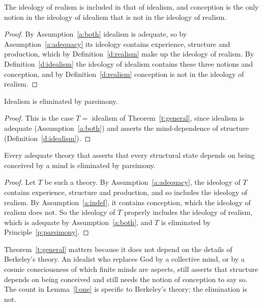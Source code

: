 \documentclass{situationist-preprint}
\begin{document}
\begin{lemma}\label{l:one}
The ideology of realism is included in that of idealism, and conception is the only notion in the ideology of idealism that is not in the ideology of realism.
\end{lemma}

\begin{proof}
By Assumption~\ref{a:both} idealism is adequate, so by Assumption~\ref{a:adequacy} its ideology contains experience, structure and production, which by Definition~\ref{d:realism} make up the ideology of realism. By Definition~\ref{d:idealism} the ideology of idealism contains these three notions and conception, and by Definition~\ref{d:realism} conception is not in the ideology of realism.
\end{proof}

\begin{theorem}\label{t:main}
Idealism is eliminated by parsimony.
\end{theorem}

\begin{proof}
This is the case $T = $ idealism of Theorem~\ref{t:general}, since idealism is adequate (Assumption~\ref{a:both}) and asserts the mind-dependence of structure (Definition~\ref{d:idealism}).
\end{proof}

\begin{theorem}[Generalization]\label{t:general}
Every adequate theory that asserts that every structural state depends on being conceived by a mind is eliminated by parsimony.
\end{theorem}

\begin{proof}
Let $T$ be such a theory. By Assumption~\ref{a:adequacy}, the ideology of $T$ contains experience, structure and production, and so includes the ideology of realism. By Assumption~\ref{a:indef}, it contains conception, which the ideology of realism does not. So the ideology of $T$ properly includes the ideology of realism, which is adequate by Assumption~\ref{a:both}, and $T$ is eliminated by Principle~\ref{p:parsimony}.
\end{proof}

Theorem~\ref{t:general} matters because it does not depend on the details of Berkeley's theory. An idealist who replaces God by a collective mind, or by a cosmic consciousness of which finite minds are aspects, still asserts that structure depends on being conceived and still needs the notion of conception to say so. The count in Lemma~\ref{l:one} is specific to Berkeley's theory; the elimination is not.
\end{document}
